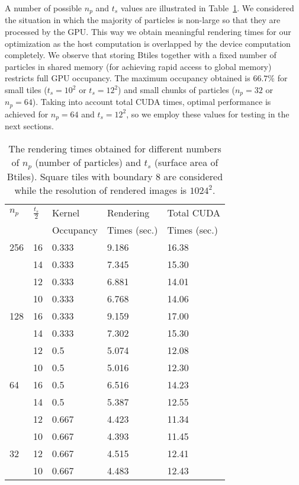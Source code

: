 \documentclass[1p]{elsarticle}
\begin{document}
A number of possible $n_p$ and $t_s$ values are illustrated in Table~\ref{tab:tuning}. We considered the situation in which the majority of particles is non-large so that they are processed by the GPU. This way we obtain meaningful rendering times for our optimization as the host computation is overlapped by the device computation completely. We observe that storing Btiles together with a fixed number of particles in shared memory (for achieving rapid access to global memory) restricts full GPU occupancy. The maximum occupancy obtained is $66.7\%$ for small tiles ($t_s = 10^{2}$ or $t_s = 12^{2}$) and small chunks of particles ($n_p = 32$ or $n_p=64$). Taking into account total CUDA times, optimal performance is achieved for $n_p=64$ and $t_s = 12^{2}$, so we employ these values for testing in the next sections.
\begin{table}
\label{tab:tuning}
\begin{center}
\begin{tabular}{|l|l|l|l|l|}
\hline
$n_p$ & $\frac{t_s}{2}$ & Kernel & Rendering & Total CUDA \\
& & Occupancy & Times (sec.) & Times (sec.) \\
\hline
256   & 16 & 0.333 & 9.186 & 16.38 \\
\hline
      & 14 & 0.333 & 7.345  & 15.30 \\
\hline
      & 12 & 0.333 & 6.881  & 14.01 \\
\hline
      & 10 & 0.333 & 6.768 & 14.06 \\
\hline
128   & 16 & 0.333 & 9.159 & 17.00 \\
\hline
      & 14 & 0.333 & 7.302  & 15.30 \\
\hline
      & 12 & 0.5 & 5.074  & 12.08 \\
\hline
      & 10 & 0.5 & 5.016 & 12.30 \\ 
\hline
64    & 16 & 0.5 & 6.516 & 14.23 \\
\hline
      & 14 & 0.5 & 5.387 & 12.55 \\
\hline
      & 12 & 0.667 & 4.423 & 11.34 \\
\hline
      & 10 & 0.667 & 4.393 & 11.45 \\ 
\hline
32    & 12 & 0.667 & 4.515 & 12.41 \\
\hline
      & 10 & 0.667 & 4.483 & 12.43 \\ 
\hline
\end{tabular}
\caption{The rendering times obtained for different numbers of $n_p$ (number of particles) and $t_s$ (surface area of Btiles). Square tiles with boundary 8 are considered while the resolution of rendered images is $1024^{2}.$}
\end{center}
\end{table}
\end{document}
